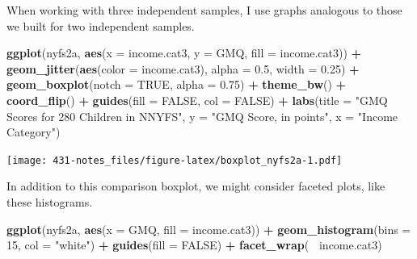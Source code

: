 \documentclass[
]{book}
\newenvironment{Shaded}{\begin{snugshade}}{\end{snugshade}}
\newcommand{\DataTypeTok}[1]{\textcolor[rgb]{0.13,0.29,0.53}{#1}}
\newcommand{\DecValTok}[1]{\textcolor[rgb]{0.00,0.00,0.81}{#1}}
\newcommand{\FloatTok}[1]{\textcolor[rgb]{0.00,0.00,0.81}{#1}}
\newcommand{\KeywordTok}[1]{\textcolor[rgb]{0.13,0.29,0.53}{\textbf{#1}}}
\newcommand{\NormalTok}[1]{#1}
\newcommand{\OperatorTok}[1]{\textcolor[rgb]{0.81,0.36,0.00}{\textbf{#1}}}
\newcommand{\OtherTok}[1]{\textcolor[rgb]{0.56,0.35,0.01}{#1}}
\newcommand{\StringTok}[1]{\textcolor[rgb]{0.31,0.60,0.02}{#1}}
\begin{document}
\begin{Shaded}
\end{Shaded}

When working with three independent samples, I use graphs analogous to those we built for two independent samples.

\begin{Shaded}
\begin{Highlighting}[]
\KeywordTok{ggplot}\NormalTok{(nyfs2a, }\KeywordTok{aes}\NormalTok{(}\DataTypeTok{x =}\NormalTok{ income.cat3, }\DataTypeTok{y =}\NormalTok{ GMQ, }\DataTypeTok{fill =}\NormalTok{ income.cat3)) }\OperatorTok{+}
\StringTok{  }\KeywordTok{geom_jitter}\NormalTok{(}\KeywordTok{aes}\NormalTok{(}\DataTypeTok{color =}\NormalTok{ income.cat3), }\DataTypeTok{alpha =} \FloatTok{0.5}\NormalTok{, }\DataTypeTok{width =} \FloatTok{0.25}\NormalTok{) }\OperatorTok{+}
\StringTok{  }\KeywordTok{geom_boxplot}\NormalTok{(}\DataTypeTok{notch =} \OtherTok{TRUE}\NormalTok{, }\DataTypeTok{alpha =} \FloatTok{0.75}\NormalTok{) }\OperatorTok{+}
\StringTok{  }\KeywordTok{theme_bw}\NormalTok{() }\OperatorTok{+}
\StringTok{  }\KeywordTok{coord_flip}\NormalTok{() }\OperatorTok{+}
\StringTok{  }\KeywordTok{guides}\NormalTok{(}\DataTypeTok{fill =} \OtherTok{FALSE}\NormalTok{, }\DataTypeTok{col =} \OtherTok{FALSE}\NormalTok{) }\OperatorTok{+}
\StringTok{  }\KeywordTok{labs}\NormalTok{(}\DataTypeTok{title =} \StringTok{"GMQ Scores for 280 Children in NNYFS"}\NormalTok{,}
       \DataTypeTok{y =} \StringTok{"GMQ Score, in points"}\NormalTok{, }\DataTypeTok{x =} \StringTok{"Income Category"}\NormalTok{)}
\end{Highlighting}
\end{Shaded}

\texttt{[image: 431-notes\_files/figure-latex/boxplot\_nyfs2a-1.pdf]}

In addition to this comparison boxplot, we might consider faceted plots, like these histograms.

\begin{Shaded}
\begin{Highlighting}[]
\KeywordTok{ggplot}\NormalTok{(nyfs2a, }\KeywordTok{aes}\NormalTok{(}\DataTypeTok{x =}\NormalTok{ GMQ, }\DataTypeTok{fill =}\NormalTok{ income.cat3)) }\OperatorTok{+}
\StringTok{  }\KeywordTok{geom_histogram}\NormalTok{(}\DataTypeTok{bins =} \DecValTok{15}\NormalTok{, }\DataTypeTok{col =} \StringTok{"white"}\NormalTok{) }\OperatorTok{+}
\StringTok{  }\KeywordTok{guides}\NormalTok{(}\DataTypeTok{fill =} \OtherTok{FALSE}\NormalTok{) }\OperatorTok{+}
\StringTok{  }\KeywordTok{facet_wrap}\NormalTok{(}\OperatorTok{~}\StringTok{ }\NormalTok{income.cat3)}
\end{Highlighting}
\end{Shaded}
\end{document}
